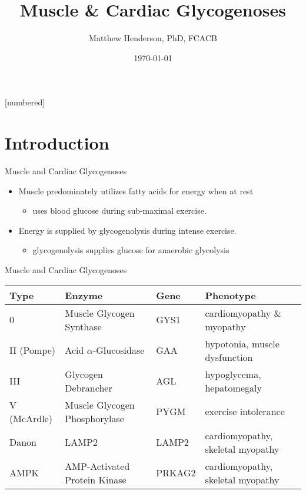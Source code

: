\documentclass[presentation, smaller]{beamer}
\author{Matthew Henderson, PhD, FCACB}
\date{\today}
\title{Muscle \& Cardiac Glycogenoses}
\institute[NSO]{Newborn Screening Ontario | The University of Ottawa}
\begin{document}
\maketitle


\vspace{220pt}
\beamertemplatenavigationsymbolsempty
{}[numbered]

\section{Introduction}
\label{sec:orgb71aa49}
\begin{frame}[label={sec:org8f1795a}]{Muscle and Cardiac Glycogenoses}
\begin{itemize}
\item Muscle predominately utilizes fatty acids for energy when at rest
\begin{itemize}
\item uses blood glucose during sub-maximal exercise.
\end{itemize}
\item Energy is supplied by glycogenolysis during intense exercise.
\begin{itemize}
\item glycogenolysis supplies glucose for anaerobic glycolysis
\end{itemize}
\end{itemize}
\end{frame}

\begin{frame}[label={sec:org9d91fd2}]{Muscle and Cardiac Glycogenoses}
\scriptsize
\begin{center}
\begin{tabular}{llll}
Type & Enzyme & Gene & Phenotype\\
\hline
0 & Muscle Glycogen Synthase & GYS1 & cardiomyopathy \& myopathy\\
II (Pompe) & Acid \(\alpha\)-Glucosidase & GAA & hypotonia, muscle dysfunction\\
III & Glycogen Debrancher & AGL & hypoglycema, hepatomegaly\\
V (McArdle) & Muscle Glycogen Phosphorylase & PYGM & exercise intolerance\\
Danon & LAMP2 & LAMP2 & cardiomyopathy, \textpm{} skeletal myopathy\\
AMPK & AMP-Activated Protein Kinase & PRKAG2 & cardiomyopathy, \textpm{} skeletal myopathy\\
\end{tabular}
\end{center}
\end{frame}
\end{document}
